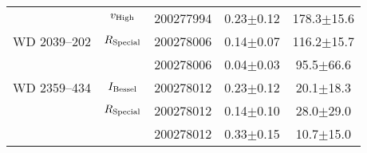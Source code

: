 \begin{table}
\begin{tabular}{lclcc}
                     & $v_{\rm High}$    & 200277994 & \phantom{0}0.23$\pm$0.12 &          178.3$\pm$15.6 \\
        WD 2039--202 & $R_{\rm Special}$ & 200278006 & \phantom{0}0.14$\pm$0.07 &          116.2$\pm$15.7 \\
                     &                   & 200278006 & \phantom{0}0.04$\pm$0.03 & \phantom{0}95.5$\pm$66.6 \\
        WD 2359--434 & $I_{\rm Bessel}$  & 200278012 & \phantom{0}0.23$\pm$0.12 & \phantom{0}20.1$\pm$18.3 \\
                     & $R_{\rm Special}$ & 200278012 & \phantom{0}0.14$\pm$0.10 & \phantom{0}28.0$\pm$29.0 \\
                     &                   & 200278012 & \phantom{0}0.33$\pm$0.15 & \phantom{0}10.7$\pm$15.0 \\
        \hline
    \end{tabular}
\end{table}        
